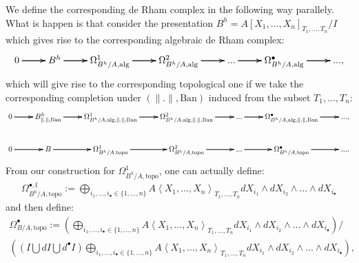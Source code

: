 \documentclass[12pt]{amsart}
\theoremstyle{definition}
\numberwithin{equation}{section}
\begin{document}
We define the corresponding de Rham complex in the following way parallely. What is happen is that consider the presentation $B^h=A[X_1,...,X_n]_{T_1,...,T_n}/I$ which gives rise to the corresponding algebraic de Rham complex:
\[
\xymatrix@C+0pc@R+0pc{
0\ar[r]\ar[r]\ar[r] &B^h \ar[r]\ar[r]\ar[r] & \Omega^1_{B^h/A,\mathrm{alg}}\ar[r]\ar[r]\ar[r] & \Omega^2_{B^h/A,\mathrm{alg}}  \ar[r]\ar[r]\ar[r] &...\ar[r]\ar[r]\ar[r] & \Omega^\bullet_{B^h/A,\mathrm{alg}} \ar[r]\ar[r]\ar[r] &..., 
}
\]
which will give rise to the corresponding topological one if we take the corresponding completion under $(\|.\|,\mathrm{Ban})$ induced from the subset $T_1,...,T_n$:
\[
\xymatrix@C+0pc@R+0pc{
0\ar[r]\ar[r]\ar[r] &B^h_{\|.\|,\mathrm{Ban}} \ar[r]\ar[r]\ar[r] & \Omega^1_{B^h/A,\mathrm{alg},\|.\|,\mathrm{Ban}}\ar[r]\ar[r]\ar[r] & \Omega^2_{B^h/A,\mathrm{alg},\|.\|,\mathrm{Ban}}  \ar[r]\ar[r]\ar[r] &...\ar[r]\ar[r]\ar[r] & \Omega^\bullet_{B^h/A,\mathrm{alg},\|.\|,\mathrm{Ban}} \ar[r]\ar[r]\ar[r] &..., \\
0\ar[r]\ar[r]\ar[r] &B \ar[r]\ar[r]\ar[r] & {\Omega}^1_{B^h/A,\mathrm{topo}}\ar[r]\ar[r]\ar[r] & {\Omega}^2_{B^h/A,\mathrm{topo}}  \ar[r]\ar[r]\ar[r] &...\ar[r]\ar[r]\ar[r] & {\Omega}^\bullet_{B^h/A,\mathrm{topo}} \ar[r]\ar[r]\ar[r] &.... 
}
\]	
From our construction for ${\Omega}^1_{B^h/A,\mathrm{topo}}$, one can actually define:
\begin{align}
{\Omega}^{\bullet,\mathrm{f}}_{B^h/A,\mathrm{topo}}:=\bigoplus_{i_1,...,i_\bullet\in \{1,...,n\}}A\left<X_1,...,X_n\right>_{T_1,...,T_n} dX_{i_1}\wedge dX_{i_2}\wedge...\wedge dX_{i_\bullet}
\end{align}
and then define:
\begin{align}
{\Omega}^{\bullet}_{B/A,\mathrm{topo}}:=\left(\bigoplus_{i_1,...,i_\bullet\in \{1,...,n\}}A\left<X_1,...,X_n\right>_{T_1,...,T_n} dX_{i_1}\wedge dX_{i_2}\wedge...\wedge dX_{i_\bullet}\right)\slash\\
\left((I\bigcup dI \bigcup d^\bullet I)\bigoplus_{i_1,...,i_\bullet\in \{1,...,n\}}A\left<X_1,...,X_n\right>_{T_1,...,T_n} dX_{i_1}\wedge dX_{i_2}\wedge...\wedge dX_{i_\bullet}\right),
\end{align}
\end{document}

